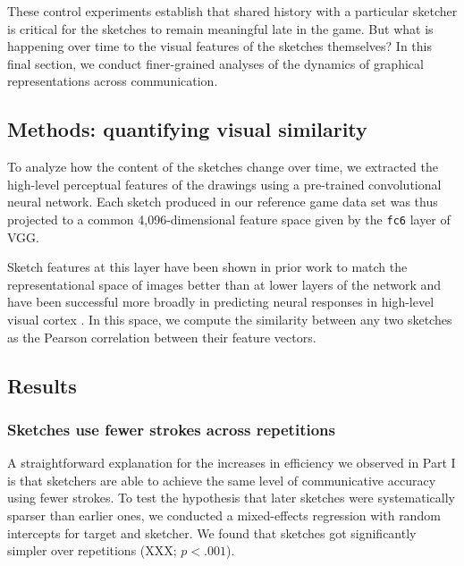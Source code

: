 \documentclass[10pt,letterpaper]{article}
\begin{document}
These control experiments establish that shared history with a particular sketcher is critical for the sketches to remain meaningful late in the game.
But what is happening over time to the visual features of the sketches themselves?
In this final section, we conduct finer-grained analyses of the dynamics of graphical representations across communication.



\subsection{Methods: quantifying visual similarity}

To analyze how the content of the sketches change over time, we extracted the high-level perceptual features of the drawings using a pre-trained convolutional neural network.
Each sketch produced in our reference game data set was thus projected to a common 4,096-dimensional feature space given by the \texttt{fc6} layer of VGG.

Sketch features at this layer have been shown in prior work to match the representational space of images better than at lower layers of the network \cite{FanCommon2018} and have been successful more broadly in predicting neural responses in high-level visual cortex \cite{yamins2014performance}.
In this space, we compute the similarity between any two sketches as the Pearson correlation between their feature vectors.

\subsection{Results}

\subsubsection{Sketches use fewer strokes across repetitions}

A straightforward explanation for the increases in efficiency we observed in Part I is that sketchers are able to achieve the same level of communicative accuracy using fewer strokes.
To test the hypothesis that later sketches were systematically sparser than earlier ones, we conducted a mixed-effects regression with random intercepts for target and sketcher.
We found that sketches got significantly simpler over repetitions (XXX; $p < .001$).
\end{document}
